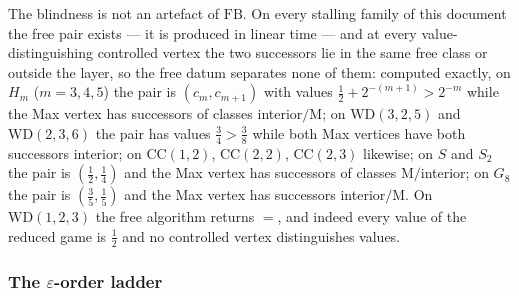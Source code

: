 \begin{remark}\label{rem:wo-stalls}
The blindness is not an artefact of $\mathrm{FB}$. On every stalling family of
this document the free pair exists --- it is produced in linear time --- and at
every value-distinguishing controlled vertex the two successors lie in the same
free class or outside the layer, so the free datum separates none of them:
computed exactly, on $H_m$ ($m=3,4,5$) the pair is $(c_m,c_{m+1})$ with values
$\tfrac12+2^{-(m+1)}>2^{-m}$ while the Max vertex has successors of classes
interior$/\mathrm M$; on $\mathrm{WD}(3,2,5)$ and $\mathrm{WD}(2,3,6)$ the pair
has values $\tfrac34>\tfrac38$ while both Max vertices have both successors
interior; on $\mathrm{CC}(1,2)$, $\mathrm{CC}(2,2)$, $\mathrm{CC}(2,3)$
likewise; on $S$ and $S_2$ the pair is $(\tfrac12,\tfrac14)$ and the Max vertex
has successors of classes $\mathrm M/$interior; on $G_8$ the pair is
$(\tfrac35,\tfrac15)$ and the Max vertex has successors interior$/\mathrm M$.
On $\mathrm{WD}(1,2,3)$ the free algorithm returns $=$, and indeed every value
of the reduced game is $\tfrac12$ and no controlled vertex distinguishes
values.
\end{remark}

\subsubsection*{The $\varepsilon$-order ladder}

